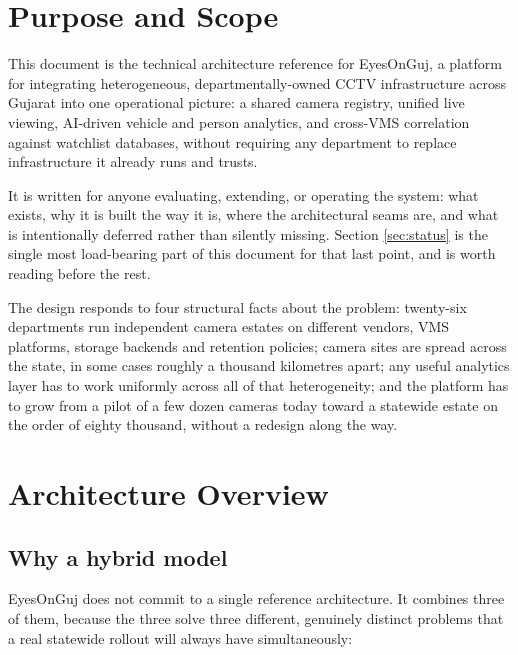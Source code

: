 \documentclass[11pt,a4paper]{article}
\begin{document}
\tableofcontents
\thispagestyle{empty}
\newpage
\setcounter{page}{1}

\section{Purpose and Scope}

This document is the technical architecture reference for EyesOnGuj, a platform
for integrating heterogeneous, departmentally-owned CCTV infrastructure across
Gujarat into one operational picture: a shared camera registry, unified live
viewing, AI-driven vehicle and person analytics, and cross-VMS correlation
against watchlist databases, without requiring any department to replace
infrastructure it already runs and trusts.

It is written for anyone evaluating, extending, or operating the system:
what exists, why it is built the way it is, where the architectural seams are,
and what is intentionally deferred rather than silently missing. Section
\ref{sec:status} is the single most load-bearing part of this document for
that last point, and is worth reading before the rest.

The design responds to four structural facts about the problem: twenty-six
departments run independent camera estates on different vendors, VMS
platforms, storage backends and retention policies; camera sites are spread
across the state, in some cases roughly a thousand kilometres apart; any
useful analytics layer has to work uniformly across all of that
heterogeneity; and the platform has to grow from a pilot of a few dozen
cameras today toward a statewide estate on the order of eighty thousand,
without a redesign along the way.

\section{Architecture Overview}
\label{sec:arch-overview}

\subsection{Why a hybrid model}

EyesOnGuj does not commit to a single reference architecture. It combines
three of them, because the three solve three different, genuinely distinct
problems that a real statewide rollout will always have simultaneously:
\end{document}
